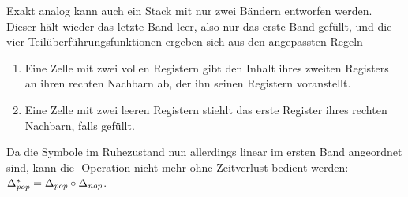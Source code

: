\documentclass{article}
\begin{document}
Exakt analog kann auch ein Stack mit nur zwei Bändern entworfen werden. Dieser hält wieder das letzte Band leer, also nur das erste Band gefüllt, und die vier Teilüberführungsfunktionen ergeben sich aus den angepassten Regeln
\begin{enumerate}
    \item Eine Zelle mit zwei vollen Registern gibt den Inhalt ihres zweiten Registers an ihren rechten Nachbarn ab, der ihn seinen Registern voranstellt.
        \begin{center}
        \end{center}
    \item Eine Zelle mit zwei leeren Registern stiehlt das erste Register ihres rechten Nachbarn, falls gefüllt.
        \begin{center}
        \end{center}
\end{enumerate}
Da die Symbole im Ruhezustand nun allerdings linear im ersten Band angeordnet sind, kann die \pop-Operation nicht mehr ohne Zeitverlust bedient werden: $\Delta^*_{\mathit{pop}}=\Delta_{\mathit{pop}} \circ \Delta_{\mathit{nop}}$.
\end{document}
